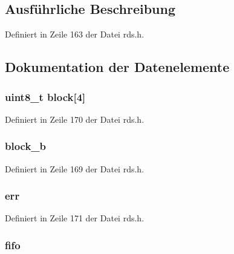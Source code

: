 \subsection{Ausführliche Beschreibung}


Definiert in Zeile 163 der Datei rds.\+h.



\subsection{Dokumentation der Datenelemente}
\hypertarget{structrds_af966591bcdc65611d3f9ec47cd36d52a}{}
\subsubsection[{block}]{\setlength{\rightskip}{0pt plus 5cm}uint8\+\_\+t block\mbox{[}4\mbox{]}}\label{structrds_af966591bcdc65611d3f9ec47cd36d52a}


Definiert in Zeile 170 der Datei rds.\+h.

\hypertarget{structrds_ad8c59b1a87492b568b0bf85aef6f5f87}{}
\subsubsection[{block\+\_\+b}]{ {\bf block\+\_\+b}}\label{structrds_ad8c59b1a87492b568b0bf85aef6f5f87}


Definiert in Zeile 169 der Datei rds.\+h.

\hypertarget{structrds_a533130a85d028e42078891666dd6c6fc}{}
\subsubsection[{err}]{ {\bf err}}\label{structrds_a533130a85d028e42078891666dd6c6fc}


Definiert in Zeile 171 der Datei rds.\+h.

\hypertarget{structrds_a7f4b3988a39d63bbb74e44a08285d9ef}{}
\subsubsection[{fifo}]{ {\bf fifo}}\label{structrds_a7f4b3988a39d63bbb74e44a08285d9ef}



